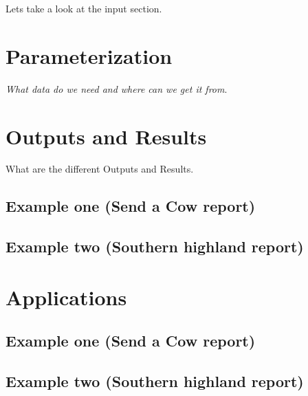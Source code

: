 \documentclass[
]{book}
\begin{document}
Lets take a look at the input section.

\hypertarget{parameterization}{%
\chapter{Parameterization}\label{parameterization}}

\emph{What data do we need and where can we get it from}.

\hypertarget{outputs-and-results}{%
\chapter{Outputs and Results}\label{outputs-and-results}}

What are the different Outputs and Results.

\hypertarget{example-one-send-a-cow-report}{%
\section{Example one (Send a Cow report)}\label{example-one-send-a-cow-report}}

\hypertarget{example-two-southern-highland-report}{%
\section{Example two (Southern highland report)}\label{example-two-southern-highland-report}}

\hypertarget{applications}{%
\chapter{Applications}\label{applications}}

\hypertarget{example-one-send-a-cow-report-1}{%
\section{Example one (Send a Cow report)}\label{example-one-send-a-cow-report-1}}

\hypertarget{example-two-southern-highland-report-1}{%
\section{Example two (Southern highland report)}\label{example-two-southern-highland-report-1}}

  
\end{document}
